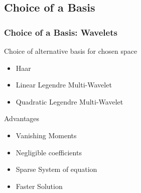   \subsection{Choice of a Basis}

    \begin{frame}
    \frametitle{Choice of a Basis: Wavelets}
    Choice of alternative basis for chosen space
        \begin{itemize}
        \item Haar
        \item Linear Legendre Multi-Wavelet
        \item Quadratic Legendre Multi-Wavelet
        \end{itemize}

     Advantages
        \begin{itemize}
        \item Vanishing Moments
        \item Negligible coefficients
        \item Sparse System of equation
        \item Faster Solution
        \end{itemize}
    \end{frame}


